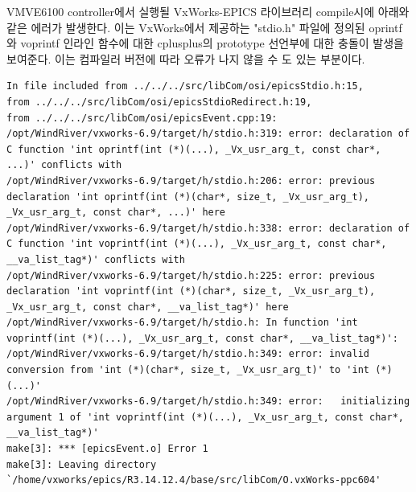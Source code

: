 \documentclass[11pt
  , a4paper
  , article
  , oneside
]{memoir}
\begin{document}
VMVE6100 controller에서 실행될 VxWorks-EPICS 라이브러리 compile시에 아래와 같은 에러가 발생한다. 이는 VxWorks에서 제공하는 "stdio.h" 파일에 정의된 oprintf와 voprintf 인라인 함수에 대한 cplusplus의 prototype 선언부에 대한 충돌이 발생을 보여준다. 이는 컴파일러 버전에 따라 오류가 나지 않을 수 도 있는 부분이다. 

\begin{lstlisting}[style=termstyle]
In file included from ../../../src/libCom/osi/epicsStdio.h:15,
from ../../../src/libCom/osi/epicsStdioRedirect.h:19,
from ../../../src/libCom/osi/epicsEvent.cpp:19:
/opt/WindRiver/vxworks-6.9/target/h/stdio.h:319: error: declaration of C function 'int oprintf(int (*)(...), _Vx_usr_arg_t, const char*, ...)' conflicts with
/opt/WindRiver/vxworks-6.9/target/h/stdio.h:206: error: previous declaration 'int oprintf(int (*)(char*, size_t, _Vx_usr_arg_t), _Vx_usr_arg_t, const char*, ...)' here
/opt/WindRiver/vxworks-6.9/target/h/stdio.h:338: error: declaration of C function 'int voprintf(int (*)(...), _Vx_usr_arg_t, const char*, __va_list_tag*)' conflicts with
/opt/WindRiver/vxworks-6.9/target/h/stdio.h:225: error: previous declaration 'int voprintf(int (*)(char*, size_t, _Vx_usr_arg_t), _Vx_usr_arg_t, const char*, __va_list_tag*)' here
/opt/WindRiver/vxworks-6.9/target/h/stdio.h: In function 'int voprintf(int (*)(...), _Vx_usr_arg_t, const char*, __va_list_tag*)':
/opt/WindRiver/vxworks-6.9/target/h/stdio.h:349: error: invalid conversion from 'int (*)(char*, size_t, _Vx_usr_arg_t)' to 'int (*)(...)'
/opt/WindRiver/vxworks-6.9/target/h/stdio.h:349: error:   initializing argument 1 of 'int voprintf(int (*)(...), _Vx_usr_arg_t, const char*, __va_list_tag*)'
make[3]: *** [epicsEvent.o] Error 1
make[3]: Leaving directory `/home/vxworks/epics/R3.14.12.4/base/src/libCom/O.vxWorks-ppc604'
\end{lstlisting}
\end{document}
